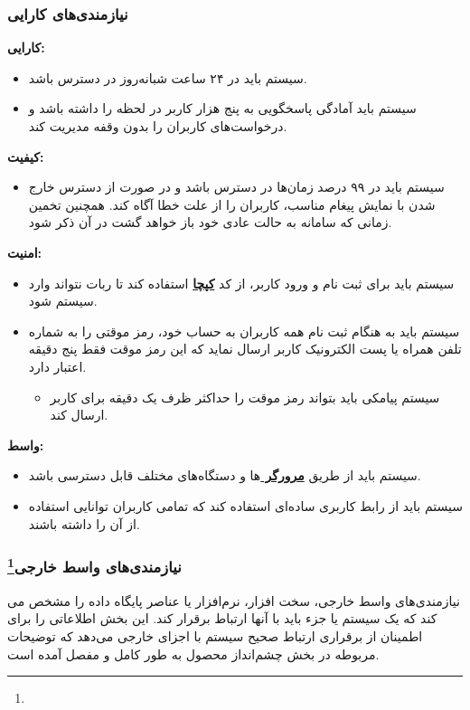 \documentclass[12pt]{article}
\begin{document}
	\subsubsection{نیازمندی‌های کارایی}

	\textbf{کارایی:}
	\begin{itemize}
		\item
		سیستم باید در ۲۴ ساعت شبانه‌روز در دسترس باشد.
		\item
		سیستم باید آمادگی پاسخگویی به پنج هزار کاربر در لحظه را داشته باشد و درخواست‌های کاربران را بدون وقفه مدیریت کند.
	\end{itemize}

	\textbf{کیفیت:}
	\begin{itemize}
		\item
		سیستم باید در ۹۹ درصد زمان‌ها در دسترس باشد و در صورت از دسترس خارج شدن با نمایش پیغام مناسب، کاربران را از علت خطا آگاه کند. همچنین تخمین زمانی که سامانه به حالت عادی خود باز خواهد گشت در آن ذکر شود.
	\end{itemize}

	\textbf{امنیت:}
	\begin{itemize}
		\item
		سیستم باید برای ثبت نام و ورود کاربر، از کد \textbf{\hyperref[ref:captcha]{کپچا}} استفاده کند تا ربات نتواند وارد سیستم شود.
		\item
		سیستم باید به هنگام ثبت نام همه کاربران به حساب خود، رمز موقتی را به شماره تلفن همراه یا پست الکترونیک کاربر ارسال نماید که این رمز موقت فقط پنج دقیقه اعتبار دارد.
		\begin{itemize}
			\item
			سیستم پیامکی باید بتواند رمز موقت را حداکثر ظرف یک دقیقه برای کاربر ارسال کند.
		\end{itemize}
	\end{itemize}

	\textbf{واسط:}
	\begin{itemize}
		\item
		سیستم باید از طریق \textbf{\hyperref[ref:browser]{مرورگر }}ها و دستگاه‌های مختلف قابل دسترسی باشد.
		\item
		سیستم باید از رابط کاربری ساده‌ای استفاده کند که تمامی کاربران توانایی استفاده از آن را داشته باشند.
	\end{itemize}

	\subsubsection{نیازمندی‌های واسط خارجی\footnote{}}
	نیازمندی‌های واسط خارجی، سخت افزار، نرم‌افزار یا عناصر پایگاه داده را مشخص می کند که یک سیستم یا جزء باید با آنها ارتباط برقرار کند. این بخش اطلاعاتی را برای اطمینان از برقراری ارتباط صحیح سیستم با اجزای خارجی می‌دهد که توضیحات مربوطه در بخش چشم‌انداز محصول به طور کامل و مفصل آمده است.
\end{document}
